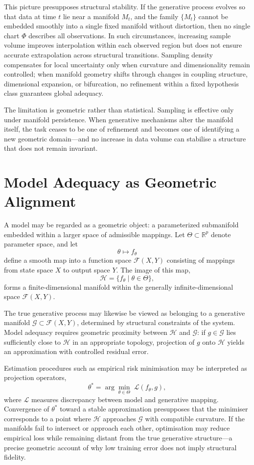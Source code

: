 \documentclass[12pt]{book}
\begin{document}
This picture presupposes structural stability. If the generative process
evolves so that data at time $t$ lie near a manifold $M_t$, and the family
$\{M_t\}$ cannot be embedded smoothly into a single fixed manifold without
distortion, then no single chart $\Phi$ describes all observations. In such
circumstances, increasing sample volume improves interpolation within each
observed region but does not ensure accurate extrapolation across structural
transitions. Sampling density compensates for local uncertainty only when
curvature and dimensionality remain controlled; when manifold geometry shifts
through changes in coupling structure, dimensional expansion, or bifurcation,
no refinement within a fixed hypothesis class guarantees global adequacy.

The limitation is geometric rather than statistical. Sampling is effective
only under manifold persistence. When generative mechanisms alter the manifold
itself, the task ceases to be one of refinement and becomes one of identifying
a new geometric domain---and no increase in data volume can stabilise a
structure that does not remain invariant.

\section{Model Adequacy as Geometric Alignment}

A model may be regarded as a geometric object: a parameterized submanifold
embedded within a larger space of admissible mappings. Let $\Theta \subset
\mathbb{R}^p$ denote parameter space, and let
\[
  \theta \mapsto f_\theta
\]
define a smooth map into a function space $\mathcal{F}(X,Y)$ consisting of
mappings from state space $X$ to output space $Y$. The image of this map,
\[
  \mathcal{H} = \{ f_\theta \mid \theta \in \Theta \},
\]
forms a finite-dimensional manifold within the generally infinite-dimensional
space $\mathcal{F}(X,Y)$.

The true generative process may likewise be viewed as belonging to a generative
manifold $\mathcal{G} \subset \mathcal{F}(X,Y)$, determined by structural
constraints of the system. Model adequacy requires geometric proximity between
$\mathcal{H}$ and $\mathcal{G}$: if $g \in \mathcal{G}$ lies sufficiently
close to $\mathcal{H}$ in an appropriate topology, projection of $g$ onto
$\mathcal{H}$ yields an approximation with controlled residual error.

Estimation procedures such as empirical risk minimisation may be interpreted
as projection operators,
\[
  \theta^* = \arg\min_{\theta \in \Theta} \; \mathcal{L}(f_\theta, g),
\]
where $\mathcal{L}$ measures discrepancy between model and generative mapping.
Convergence of $\theta^*$ toward a stable approximation presupposes that the
minimiser corresponds to a point where $\mathcal{H}$ approaches $\mathcal{G}$
with compatible curvature. If the manifolds fail to intersect or approach each
other, optimisation may reduce empirical loss while remaining distant from the
true generative structure---a precise geometric account of why low training
error does not imply structural fidelity.
\end{document}
